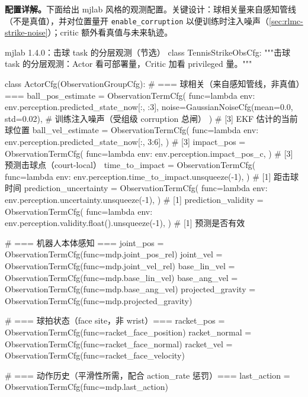 \textbf{配置详解。}下面给出 mjlab 风格的观测配置。关键设计：球相关量来自感知管线（不是真值），并对位置量开 \verb|enable_corruption| 以便训练时注入噪声（\cref{sec:rlmc-strike-noise}）；critic 额外看真值与未来轨迹。

\begin{codebox}[Python]{mjlab 1.4.0：击球 task 的分层观测（节选）}
class TennisStrikeObsCfg:
    """击球 task 的分层观测：Actor 看可部署量，Critic 加看 privileged 量。"""

    class ActorCfg(ObservationGroupCfg):
        # === 球相关（来自感知管线，非真值）===
        ball_pos_estimate = ObservationTermCfg(
            func=lambda env: env.perception.predicted_state_now[:, :3],
            noise=GaussianNoiseCfg(mean=0.0, std=0.02),  # 训练注入噪声（受组级 corruption 总闸）
        )                                     # [3] EKF 估计的当前球位置
        ball_vel_estimate = ObservationTermCfg(
            func=lambda env: env.perception.predicted_state_now[:, 3:6],
        )                                     # [3]
        impact_pos = ObservationTermCfg(
            func=lambda env: env.perception.impact_pos_c,
        )                                     # [3] 预测击球点（court-local）
        time_to_impact = ObservationTermCfg(
            func=lambda env: env.perception.time_to_impact.unsqueeze(-1),
        )                                     # [1] 距击球时间
        prediction_uncertainty = ObservationTermCfg(
            func=lambda env: env.perception.uncertainty.unsqueeze(-1),
        )                                     # [1]
        prediction_validity = ObservationTermCfg(
            func=lambda env: env.perception.validity.float().unsqueeze(-1),
        )                                     # [1] 预测是否有效

        # === 机器人本体感知 ===
        joint_pos = ObservationTermCfg(func=mdp.joint_pos_rel)
        joint_vel = ObservationTermCfg(func=mdp.joint_vel_rel)
        base_lin_vel = ObservationTermCfg(func=mdp.base_lin_vel)
        base_ang_vel = ObservationTermCfg(func=mdp.base_ang_vel)
        projected_gravity = ObservationTermCfg(func=mdp.projected_gravity)

        # === 球拍状态（face site，非 wrist）===
        racket_pos = ObservationTermCfg(func=racket_face_position)
        racket_normal = ObservationTermCfg(func=racket_face_normal)
        racket_vel = ObservationTermCfg(func=racket_face_velocity)

        # === 动作历史（平滑性所需，配合 action_rate 惩罚）===
        last_action = ObservationTermCfg(func=mdp.last_action)


\end{codebox}

